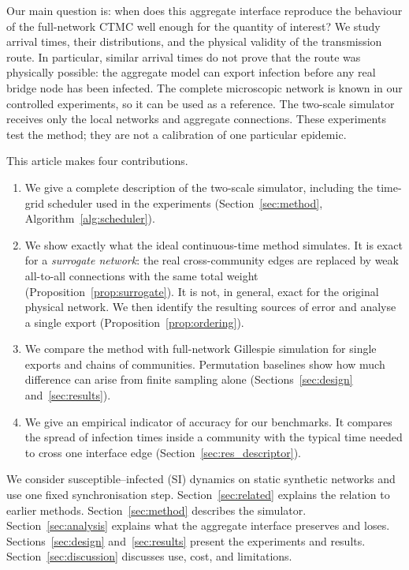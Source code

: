 Our main question is: when does this aggregate interface reproduce the behaviour of the full-network CTMC well enough for the quantity of interest? We study arrival times, their distributions, and the physical validity of the transmission route. In particular, similar arrival times do not prove that the route was physically possible: the aggregate model can export infection before any real bridge node has been infected. The complete microscopic network is known in our controlled experiments, so it can be used as a reference. The two-scale simulator receives only the local networks and aggregate connections. These experiments test the method; they are not a calibration of one particular epidemic.

This article makes four contributions.
\begin{enumerate}
\item We give a complete description of the two-scale simulator, including the time-grid scheduler used in the experiments (Section~\ref{sec:method}, Algorithm~\ref{alg:scheduler}).
\item We show exactly what the ideal continuous-time method simulates. It is exact for a \emph{surrogate network}: the real cross-community edges are replaced by weak all-to-all connections with the same total weight (Proposition~\ref{prop:surrogate}). It is not, in general, exact for the original physical network. We then identify the resulting sources of error and analyse a single export (Proposition~\ref{prop:ordering}).
\item We compare the method with full-network Gillespie simulation for single exports and chains of communities. Permutation baselines show how much difference can arise from finite sampling alone (Sections~\ref{sec:design} and~\ref{sec:results}).
\item We give an empirical indicator of accuracy for our benchmarks. It compares the spread of infection times inside a community with the typical time needed to cross one interface edge (Section~\ref{sec:res_descriptor}).
\end{enumerate}

We consider susceptible--infected (SI) dynamics on static synthetic networks and use one fixed synchronisation step. Section~\ref{sec:related} explains the relation to earlier methods. Section~\ref{sec:method} describes the simulator. Section~\ref{sec:analysis} explains what the aggregate interface preserves and loses. Sections~\ref{sec:design} and~\ref{sec:results} present the experiments and results. Section~\ref{sec:discussion} discusses use, cost, and limitations.

